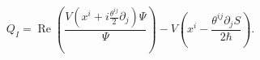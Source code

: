 \begin{equation}
Q_{I}=\operatorname{Re}\left(  \frac{V\left(  x^{i}+i\frac{\theta^{ij}}%
{2}\partial_{j}\right)  \Psi}{\Psi}\right)  -V\left(  x^{i}-\frac{\theta
^{ij}\partial_{j}S}{2\hbar}\right)  .\label{42}%
\end{equation}

